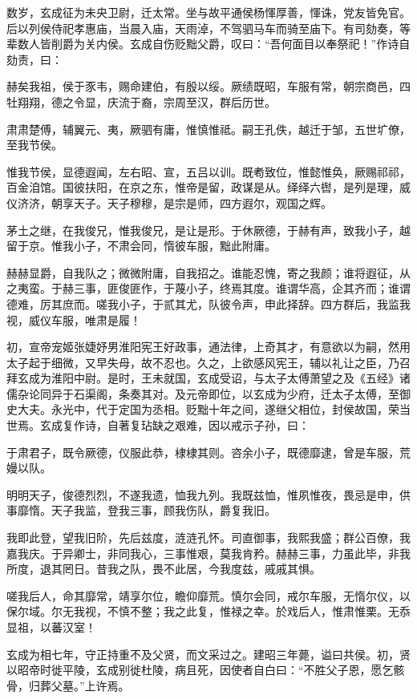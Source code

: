 \documentclass[]{article}
\begin{document}
数岁，玄成征为未央卫尉，迁太常。坐与故平通侯杨惲厚善，惲诛，党友皆免官。后以列侯侍祀孝惠庙，当晨入庙，天雨淖，不驾驷马车而骑至庙下。有司劾奏，等辈数人皆削爵为关内侯。玄成自伤贬黜父爵，叹曰：``吾何面目以奉祭祀！''作诗自劾责，曰：

赫矣我祖，侯于豕韦，赐命建伯，有殷以绥。厥绩既昭，车服有常，朝宗商邑，四牡翔翔，德之令显，庆流于裔，宗周至汉，群后历世。

肃肃楚傅，辅翼元、夷，厥驷有庸，惟慎惟祗。嗣王孔佚，越迁于邹，五世圹僚，至我节侯。

惟我节侯，显德遐闻，左右昭、宣，五吕以训。既耇致位，惟懿惟奂，厥赐祁祁，百金洎馆。国彼扶阳，在京之东，惟帝是留，政谋是从。绎绎六辔，是列是理，威仪济济，朝享天子。天子穆穆，是宗是师，四方遐尔，观国之辉。

茅土之继，在我俊兄，惟我俊兄，是让是形。于休厥德，于赫有声，致我小子，越留于京。惟我小子，不肃会同，惰彼车服，黜此附庸。

赫赫显爵，自我队之；微微附庸，自我招之。谁能忍愧，寄之我颜；谁将遐征，从之夷蛮。于赫三事，匪俊匪作，于蔑小子，终焉其度。谁谓华高，企其齐而；谁谓德难，厉其庶而。嗟我小子，于贰其尤，队彼令声，申此择辞。四方群后，我监我视，威仪车服，唯肃是履！

初，宣帝宠姬张婕妤男淮阳宪王好政事，通法律，上奇其才，有意欲以为嗣，然用太子起于细微，又早失母，故不忍也。久之，上欲感风宪王，辅以礼让之臣，乃召拜玄成为淮阳中尉。是时，王未就国，玄成受诏，与太子太傅萧望之及《五经》诸儒杂论同异于石渠阁，条奏其对。及元帝即位，以玄成为少府，迁太子太傅，至御史大夫。永光中，代于定国为丞相。贬黜十年之间，遂继父相位，封侯故国，荣当世焉。玄成复作诗，自著复玷缺之艰难，因以戒示子孙，曰：

于肃君子，既令厥德，仪服此恭，棣棣其则。咨余小子，既德靡逮，曾是车服，荒嫚以队。

明明天子，俊德烈烈，不遂我遗，恤我九列。我既兹恤，惟夙惟夜，畏忌是申，供事靡惰。天子我监，登我三事，顾我伤队，爵复我旧。

我即此登，望我旧阶，先后兹度，涟涟孔怀。司直御事，我熙我盛；群公百僚，我嘉我庆。于异卿士，非同我心，三事惟艰，莫我肯矜。赫赫三事，力虽此毕，非我所度，退其罔日。昔我之队，畏不此居，今我度兹，戚戚其惧。

嗟我后人，命其靡常，靖享尔位，瞻仰靡荒。慎尔会同，戒尔车服，无惰尔仪，以保尔域。尔无我视，不慎不整；我之此复，惟禄之幸。於戏后人，惟肃惟栗。无忝显祖，以蕃汉室！

玄成为相七年，守正持重不及父贤，而文采过之。建昭三年薨，谥曰共侯。初，贤以昭帝时徙平陵，玄成别徙杜陵，病且死，因使者自白曰：``不胜父子恩，愿乞骸骨，归葬父墓。''上许焉。
\end{document}
